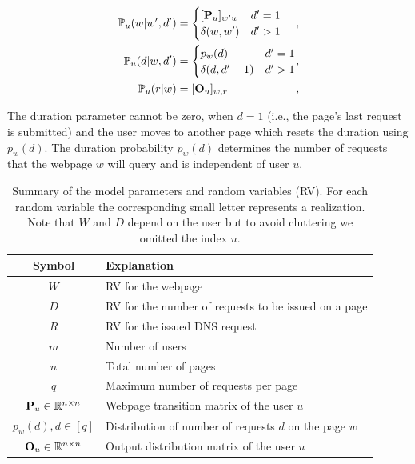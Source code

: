 	
	
	\begin{equation}
	\label{eq:probs}
	\begin{alignedat}{3}
	\pr_u(w | w', d') &= 
	\begin{cases} 
	[\bP_u]_{w'w} & d' = 1  \\
	\delta(w, w') & d' > 1
	\end{cases} &,&
	\\ 
	\pr_u(d | w, d') &= 
	\begin{cases} 
	p_{w}(d) & d' = 1 \\
	\delta(d, d'-1) & d' > 1
	\end{cases} &,&
	\\   
	\pr_u(r|w) &= [\O_{u}]_{w, r}&,&	
	\end{alignedat} 
	\end{equation}
	
	The duration parameter cannot be zero, when $d = 1$ (i.e., the page's last request is submitted) and the user moves to another page which resets the duration using $p_w(d)$. 
	The duration probability $p_w(d)$ determines the number of requests that the webpage $w$ will query and is independent of user $u$. 
	
	\begin{table}
		\centering
		\begin{tabular}{|c|l}
			\hline
			Symbol & Explanation \\ 
			\hline 
			$W$ & RV for the webpage \\ \hline
			$D$ & RV for the number of requests to be issued on a page \\ \hline
			$R$ & RV for the issued DNS request \\ \hline
			\hline 
			$m$ & Number of users \\ \hline
			$n$ & Total number of pages \\ \hline
			$q$ & Maximum number of requests per page \\ \hline 
			\hline 
			$\mathbf{P}_u \in \mathbb R^{n \times n}$ & Webpage transition matrix of the user $u$ \\ \hline 
			$p_w(d), d \in [q]$ & Distribution of number of requests $d$ on the page $w$ \\ \hline 
			$\mathbf{O}_u \in \mathbb R^{n \times n}$ & Output distribution matrix of the user $u$  \\ \hline
		\end{tabular}
		\caption{Summary of the model parameters and random variables (RV). For each random variable the corresponding small letter represents a realization. Note that $W$ and $D$ depend on the user but to avoid cluttering we omitted the index $u$.}
		\label{tab:params}
	\end{table}
	
